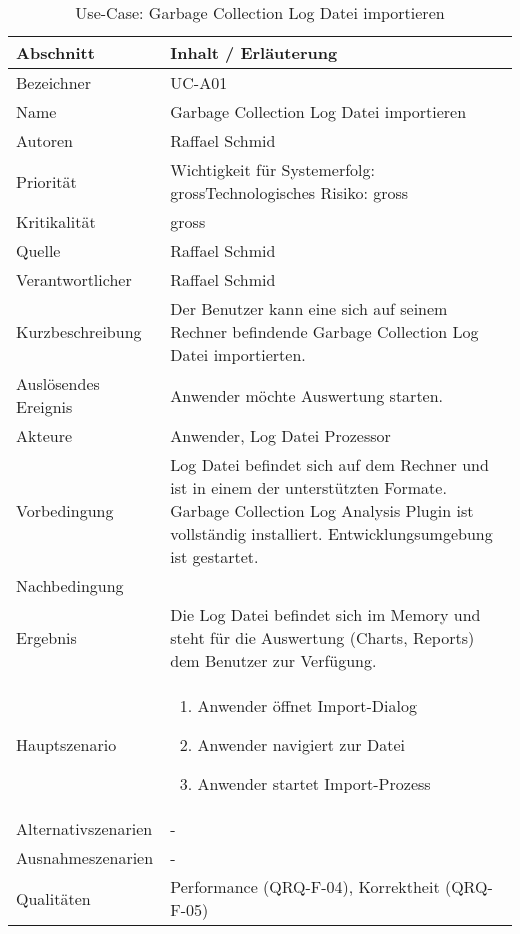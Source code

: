 \begin{longtable}{|p{4cm}|p{10.5cm}|}
\caption{Use-Case: Garbage Collection Log Datei importieren}\\\hline
   \textbf{Abschnitt} & \textbf{Inhalt / Erläuterung} \\\hline
   Bezeichner & UC-A01\\\hline
   Name & Garbage Collection Log Datei importieren\\\hline
   Autoren & Raffael Schmid\\\hline
   Priorität & Wichtigkeit für Systemerfolg: gross\newline Technologisches Risiko: gross\\\hline
   Kritikalität & gross\\\hline
   Quelle & Raffael Schmid\\\hline
   Verantwortlicher & Raffael Schmid\\\hline
   Kurzbeschreibung & Der Benutzer kann eine sich auf seinem Rechner befindende Garbage Collection Log Datei importierten.\\\hline
   Auslösendes Ereignis & Anwender möchte Auswertung starten.\\\hline
   Akteure & Anwender, Log Datei Prozessor\\\hline
   Vorbedingung & Log Datei befindet sich auf dem Rechner und ist in einem der unterstützten Formate. Garbage Collection Log Analysis Plugin ist vollständig installiert. Entwicklungsumgebung ist gestartet.\\\hline
   Nachbedingung & \\\hline
   Ergebnis & Die Log Datei befindet sich im Memory und steht für die Auswertung (Charts, Reports) dem Benutzer zur Verfügung.\\\hline
   Hauptszenario & 
	\begin{enumerate}
		\item Anwender öffnet Import-Dialog
		\item Anwender navigiert zur Datei
		\item Anwender startet Import-Prozess
	\end{enumerate}
	\\\hline
   Alternativszenarien & -\\\hline
   Ausnahmeszenarien & -\\\hline
   Qualitäten & Performance (QRQ-F-04), Korrektheit (QRQ-F-05)\\\hline
\end{longtable}


